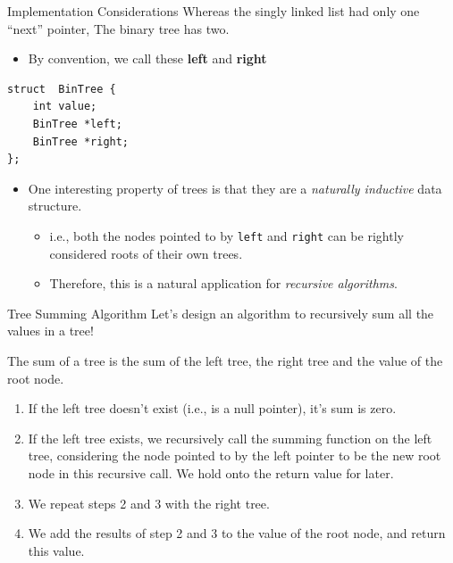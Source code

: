 \documentclass[11pt]{beamer}
\begin{document}
\begin{frame}[fragile=singleslide]{Implementation Considerations}
Whereas the singly linked list had only one ``next'' pointer, The binary tree has two.
\begin{itemize}
\item By convention, we call these \textbf{left} and \textbf{right}
\end{itemize}
\begin{lstlisting}[style=C]
struct  BinTree {
	int value;
	BinTree *left;
	BinTree *right;
};
\end{lstlisting} 
\begin{itemize}
\item One interesting property of trees is that they are a \emph{naturally inductive} data structure.
\begin{itemize}
\item i.e., both the nodes pointed to by \texttt{left} and \texttt{right} can be rightly considered roots of their own trees.  
\item Therefore, this is a natural application for \emph{recursive algorithms}.
\end{itemize}
\end{itemize}
\end{frame}

\begin{frame}[fragile=singleslide]{Tree Summing Algorithm}
Let's design an algorithm to recursively sum all the values in a tree!

The sum of a tree is the sum of the left tree, the right tree and the value of the root node.
\begin{enumerate}
\item If the left tree doesn't exist (i.e., is a null pointer), it's sum is zero.
\item If the left tree exists, we recursively call the summing function on the left tree, considering the node pointed to by the left pointer to be the new root node in this recursive call.  We hold onto the return value for later.
\item We repeat steps 2 and 3 with the right tree.
\item We add the results of step 2 and 3 to the value of the root node, and return this value. 
\end{enumerate}
\end{frame}
\end{document}
